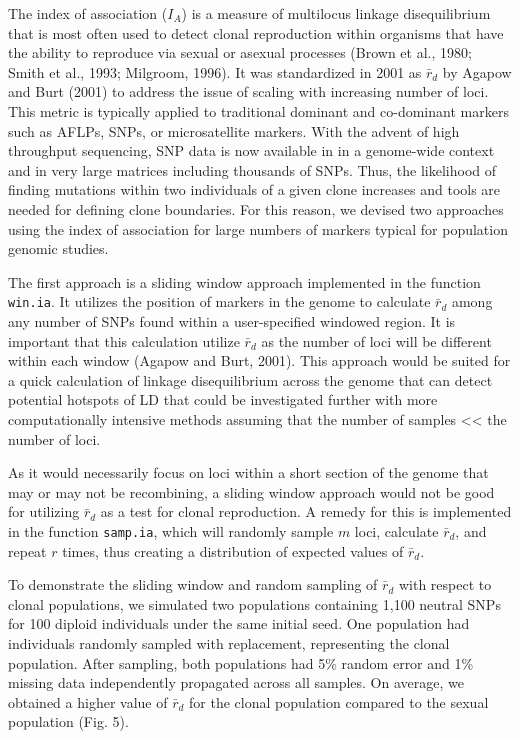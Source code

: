 \documentclass{frontiersSCNS} %
\begin{document}
The index of association (\(I_A\)) is a measure of multilocus linkage
disequilibrium that is most often used to detect clonal reproduction
within organisms that have the ability to reproduce via sexual or
asexual processes (Brown et al., 1980; Smith et al., 1993; Milgroom,
1996). It was standardized in 2001 as \(\bar{r}_d\) by Agapow and Burt
(2001) to address the issue of scaling with increasing number of loci.
This metric is typically applied to traditional dominant and co-dominant
markers such as AFLPs, SNPs, or microsatellite markers. With the advent
of high throughput sequencing, SNP data is now available in in a
genome-wide context and in very large matrices including thousands of
SNPs. Thus, the likelihood of finding mutations within two individuals
of a given clone increases and tools are needed for defining clone
boundaries. For this reason, we devised two approaches using the index
of association for large numbers of markers typical for population
genomic studies.

The first approach is a sliding window approach implemented in the
function \texttt{win.ia}. It utilizes the position of markers in the
genome to calculate \(\bar{r}_d\) among any number of SNPs found within
a user-specified windowed region. It is important that this calculation
utilize \(\bar{r}_d\) as the number of loci will be different within
each window (Agapow and Burt, 2001). This approach would be suited for a
quick calculation of linkage disequilibrium across the genome that can
detect potential hotspots of LD that could be investigated further with
more computationally intensive methods assuming that the number of
samples \textless{}\textless{} the number of loci.

As it would necessarily focus on loci within a short section of the
genome that may or may not be recombining, a sliding window approach
would not be good for utilizing \(\bar{r}_d\) as a test for clonal
reproduction. A remedy for this is implemented in the function
\texttt{samp.ia}, which will randomly sample \(m\) loci, calculate
\(\bar{r}_d\), and repeat \(r\) times, thus creating a distribution of
expected values of \(\bar{r}_d\).

To demonstrate the sliding window and random sampling of \(\bar{r}_d\)
with respect to clonal populations, we simulated two populations
containing 1,100 neutral SNPs for 100 diploid individuals under the same
initial seed. One population had individuals randomly sampled with
replacement, representing the clonal population. After sampling, both
populations had 5\% random error and 1\% missing data independently
propagated across all samples. On average, we obtained a higher value of
\(\bar{r}_d\) for the clonal population compared to the sexual
population (Fig. 5).
\end{document}

